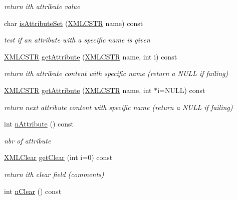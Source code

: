 \begin{DoxyCompactItemize}
\begin{DoxyCompactList}\small\item\em return ith attribute value \end{DoxyCompactList}\item 
char \hyperlink{group__navigate_ga8059888e8dd5d9caf04f765059c1b934}{is\-Attribute\-Set} (\hyperlink{xmlParser_8h_acdb0d6fd8dd596384b438d86cfb2b182}{X\-M\-L\-C\-S\-T\-R} name) const 
\begin{DoxyCompactList}\small\item\em test if an attribute with a specific name is given \end{DoxyCompactList}\item 
\hyperlink{xmlParser_8h_acdb0d6fd8dd596384b438d86cfb2b182}{X\-M\-L\-C\-S\-T\-R} \hyperlink{group__navigate_gaba897c342d3c55d71f4d987332789f69}{get\-Attribute} (\hyperlink{xmlParser_8h_acdb0d6fd8dd596384b438d86cfb2b182}{X\-M\-L\-C\-S\-T\-R} name, int i) const 
\begin{DoxyCompactList}\small\item\em return ith attribute content with specific name (return a N\-U\-L\-L if failing) \end{DoxyCompactList}\item 
\hyperlink{xmlParser_8h_acdb0d6fd8dd596384b438d86cfb2b182}{X\-M\-L\-C\-S\-T\-R} \hyperlink{group__navigate_ga23af0b5c771a9a5e7503a7dd2de72fc8}{get\-Attribute} (\hyperlink{xmlParser_8h_acdb0d6fd8dd596384b438d86cfb2b182}{X\-M\-L\-C\-S\-T\-R} name, int $\ast$i=N\-U\-L\-L) const 
\begin{DoxyCompactList}\small\item\em return next attribute content with specific name (return a N\-U\-L\-L if failing) \end{DoxyCompactList}\item 
int \hyperlink{group__navigate_ga9561f62b9ed1fa653fe9135c4f16a41d}{n\-Attribute} () const 
\begin{DoxyCompactList}\small\item\em nbr of attribute \end{DoxyCompactList}\item 
\hyperlink{structXMLClear}{X\-M\-L\-Clear} \hyperlink{group__navigate_gab99fbcb5534ab2194889c4802e290354}{get\-Clear} (int i=0) const 
\begin{DoxyCompactList}\small\item\em return ith clear field (comments) \end{DoxyCompactList}\item 
int \hyperlink{group__navigate_ga87d34f1ba1ba7d49e8aeacc63548dead}{n\-Clear} () const 

\end{DoxyCompactItemize}
